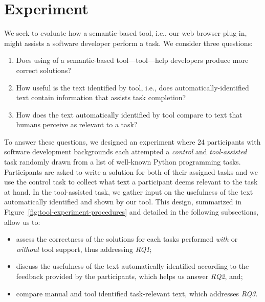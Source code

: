 




\section{Experiment}
\label{cp6:experiment}



We seek to evaluate how a semantic-based tool, i.e., our web browser plug-in, might assists a software developer perform a task.
We consider three questions:


\begin{enumerate}[label=\textit{RQ}\arabic*]
    \item Does using of a semantic-based tool---\acs{tool}---help developers produce more correct solutions? 
    \item How useful is the text identified by \acs{tool}, i.e., does  automatically-identified text contain information that assists task completion? 
    \item How does the text automatically identified by \acs{tool} compare to text 
    that humans perceive as relevant to a task?
\end{enumerate}



To answer these questions, we designed an experiment where 24 participants with software development backgrounds each attempted a
\textit{control} and \textit{tool-assisted} task randomly drawn from a list of well-known Python programming tasks.
Participants are asked to write a solution for both of their assigned tasks
and we use the control task to collect what text a participant deems relevant to the task at hand.
In the tool-assisted task, we gather input on the usefulness of the text automatically identified and shown by our tool. 
This design, summarized in Figure~\ref{fig:tool-experiment-procedures} and detailed in the following subsections,  allow us to:






\begin{itemize}
    \item assess the correctness of the solutions for each tasks performed \textit{with} or \textit{without} tool support, thus addressing \textit{RQ1};
     
    \item discuss the usefulness of the text automatically identified  according to the feedback provided by the participants, which helps us answer \textit{RQ2}, and;

    \item compare manual and tool identified task-relevant text, which addresses \textit{RQ3}. 
\end{itemize}
 


